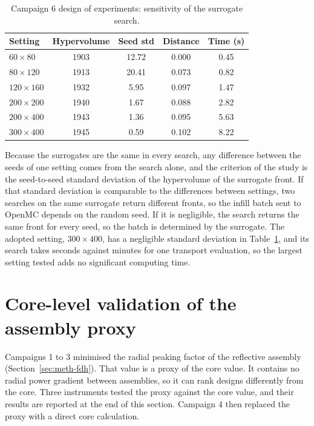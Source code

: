 \begin{table}[htbp]
  \centering
  \caption{Campaign 6 design of experiments: sensitivity of the surrogate search.}
  \label{tab:nsga-sens}
  \begin{tabular}{lcccc}
    \toprule
    Setting & Hypervolume & Seed std & Distance & Time (s) \\
    \midrule
    $60\times80$   & 1903 & 12.72 & 0.000 & 0.45 \\
    $80\times120$  & 1913 & 20.41 & 0.073 & 0.82 \\
    $120\times160$ & 1932 &  5.95 & 0.097 & 1.47 \\
    $200\times200$ & 1940 &  1.67 & 0.088 & 2.82 \\
    $200\times400$ & 1943 &  1.36 & 0.095 & 5.63 \\
    $300\times400$ & 1945 &  0.59 & 0.102 & 8.22 \\
    \bottomrule
  \end{tabular}
\end{table}

Because the surrogates are the same in every search, any difference
between the seeds of one setting comes from the search alone, and the
criterion of the study is the seed-to-seed standard deviation of the
hypervolume of the surrogate front. If that standard deviation is
comparable to the differences between settings, two searches on the
same surrogate return different fronts, so the infill batch sent to
OpenMC depends on the random seed. If it is negligible, the search
returns the same front for every seed, so the batch is determined by
the surrogate. The adopted setting, $300\times400$, has a negligible
standard deviation in Table~\ref{tab:nsga-sens}, and its search takes
seconds against minutes for one transport evaluation, so the largest
setting tested adds no significant computing time.

\section{Core-level validation of the assembly proxy}
\label{sec:meth-core-objective}

Campaigns 1 to 3 minimised the radial peaking factor of the reflective
assembly (Section~\ref{sec:meth-fdh}). That value is a proxy of the core
value. It contains no radial power gradient between assemblies, so it
can rank designs differently from the core. Three instruments tested the
proxy against the core value, and their results are reported at the end
of this section. Campaign 4 then replaced the proxy with a direct core
calculation.

